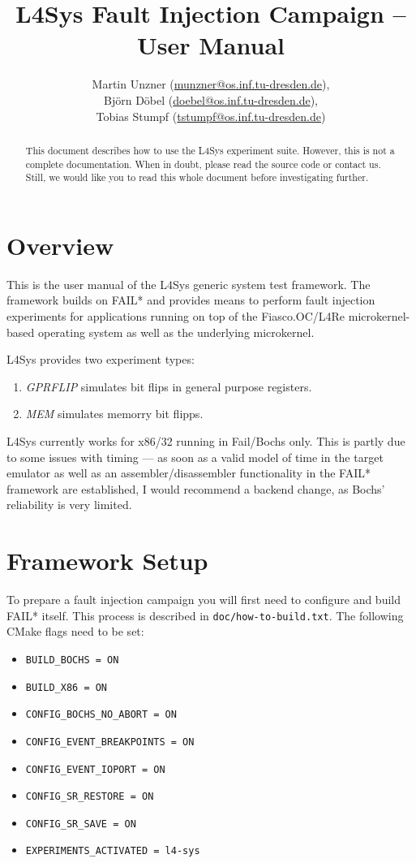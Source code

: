 \documentclass[a4paper,times,9pt]{article}
\title{L4Sys Fault Injection Campaign -- User Manual}
\author{Martin Unzner (\href{mailto:munzner@os.inf.tu-dresden.de}{munzner@os.inf.tu-dresden.de}), \\
        Björn Döbel (\href{mailto:doebel@os.inf.tu-dresden.de}{doebel@os.inf.tu-dresden.de}), \\   
        Tobias Stumpf (\href{mailto:tstumpf@os.inf.tu-dresden.de}{tstumpf@os.inf.tu-dresden.de})}
\newcommand{\lfs}{L4Sys}
\begin{document}
\maketitle

\begin{abstract}
This document describes how to use the L4Sys experiment suite.
However, this is not a complete documentation. When in doubt,
please read the source code or contact us. Still, we would like
you to read this whole document before investigating further.
\end{abstract}

\section{Overview}

This is the user manual of the \lfs{} generic system test framework.
The framework builds on FAIL* and provides means to perform fault injection
experiments for applications running on top of the Fiasco.OC/L4Re
microkernel-based operating system as well as the underlying microkernel.

\noindent \lfs{} provides two experiment types:
\begin{enumerate}[topsep=0em,itemsep=0em]
  \item \emph{GPRFLIP} simulates bit flips in general purpose registers.
  \item \emph{MEM} simulates memorry bit flipps.
\end{enumerate}

\noindent \lfs{} currently works for x86/32 running in Fail/Bochs only.
This is partly due to some issues with timing --- as soon as a valid model of
time in the target emulator as well as an assembler/disassembler functionality
in the FAIL* framework are established, I would recommend a backend change, as
Bochs' reliability is very limited.

\section{Framework Setup}

To prepare a fault injection campaign you will first need to configure and
build FAIL* itself. This process is described in \texttt{doc/how-to-build.txt}.
The following CMake flags need to be set:

\begin{itemize}[itemsep=0em]
\item \verb+BUILD_BOCHS = ON+
\item \verb+BUILD_X86 = ON+
\item \verb+CONFIG_BOCHS_NO_ABORT = ON+
\item \verb+CONFIG_EVENT_BREAKPOINTS = ON+
\item \verb+CONFIG_EVENT_IOPORT = ON+
\item \verb+CONFIG_SR_RESTORE = ON+
\item \verb+CONFIG_SR_SAVE = ON+
\item \verb+EXPERIMENTS_ACTIVATED = l4-sys+
\end{itemize}
\end{document}

